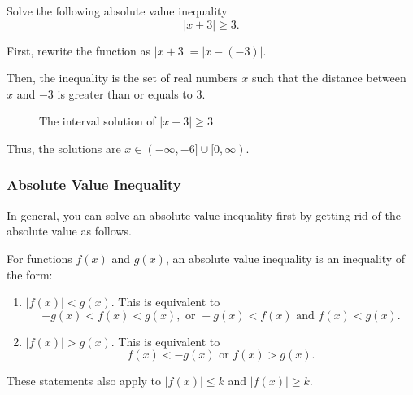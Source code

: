 \begin{frame}[t]
\begin{ex}
Solve the following absolute value inequality
\[|x+3| \geq 3.\]
\end{ex}
\begin{sol}
First, rewrite the function as $|x+3| = |x - (-3)|$. 

Then, the inequality is the set of real numbers $x$ such that the distance between $x$ and $-3$ is greater than or equals to 3. 

\begin{figure}[h!]
\centering
{}
\caption{The interval solution of $|x+3| \geq 3$}
\end{figure}

Thus, the solutions are $x \in (-\infty,-6] \cup [0, \infty)$.
\end{sol}
\end{frame}

\begin{frame}
\frametitle{Absolute Value Inequality}
In general, you can solve an absolute value inequality first by getting rid of the absolute value as follows.
\begin{defn}{}{}
For functions $f(x)$ and $g(x)$, an absolute value inequality is an inequality of the form:
\begin{enumerate}
\item $| f(x) | < g(x)$. This is equivalent to 
\[-g(x) < f(x) < g(x), \text{ or } -g(x) < f(x) \text{ and } f(x) < g(x).\]
\item $|f(x)| > g(x)$. This is equivalent to 
\[f(x) < -g(x) \text{ or } f(x) > g(x).\]
\end{enumerate}
These statements also apply to $|f(x)| \leq k$ and $|f(x)| \geq k$.
\end{defn}
\end{frame}


